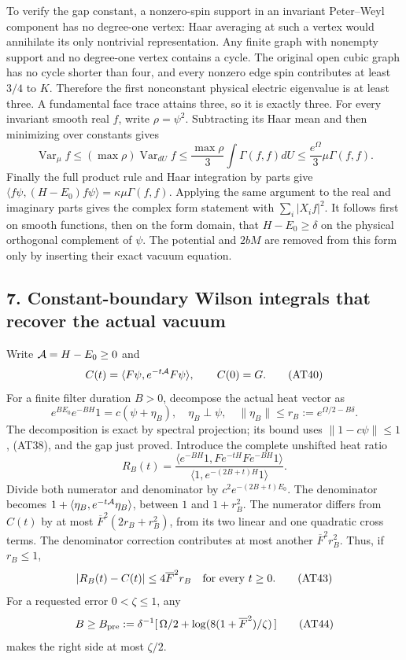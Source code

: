 \documentclass[11pt]{article}
\begin{document}
To verify the gap constant, a nonzero-spin support in an invariant Peter–Weyl component has no degree-one vertex: Haar averaging at such a vertex would annihilate its only nontrivial representation. Any finite graph with nonempty support and no degree-one vertex contains a cycle. The original open cubic graph has no cycle shorter than four, and every nonzero edge spin contributes at least \(3/4\) to \(K\). Therefore the first nonconstant physical electric eigenvalue is at least three. A fundamental face trace attains three, so it is exactly three.
For every invariant smooth real \(f\), write \(\rho=\psi^2\). Subtracting its Haar mean and then minimizing over constants gives
\[
 \operatorname{Var}_\mu f
 \le(\max\rho)\operatorname{Var}_{dU}f
 \le\frac{\max\rho}{3}\int\Gamma(f,f)dU
 \le\frac{e^\Omega}{3}\mu\Gamma(f,f).
 \tag{AT39}
\]
Finally the full product rule and Haar integration by parts give
\(\langle f\psi,(H-E_0)f\psi\rangle=\kappa\mu\Gamma(f,f)\).
Applying the same argument to the real and imaginary parts gives the complex form statement with \(\sum_i|X_if|^2\). It follows first on smooth functions, then on the form domain, that
\(H-E_0\ge\delta\) on the physical orthogonal complement of \(\psi\).
The potential and \(2bM\) are removed from this form only by inserting their exact vacuum equation.

\subsection*{7. Constant-boundary Wilson integrals that recover the actual vacuum}

Write \({\cal A}=H-E_0\ge0\) and
\[
 C(t)=\langle F\psi,e^{-t{\cal A}}F\psi\rangle,\qquad C(0)=G.
 \tag{AT40}
\]
For a finite filter duration \(B>0\), decompose the actual heat vector as
\[
 e^{BE_0}e^{-BH}1=c(\psi+\eta_B),\quad
 \eta_B\perp\psi,\quad
 \|\eta_B\|\le r_B:=e^{\Omega/2-B\delta}.
 \tag{AT41}
\]
The decomposition is exact by spectral projection; its bound uses
\(\|1-c\psi\|\le1\), (AT38), and the gap just proved. Introduce the complete unshifted heat ratio
\[
 R_B(t)=
 \frac{\langle e^{-BH}1,F e^{-tH}F e^{-BH}1\rangle}
      {\langle1,e^{-(2B+t)H}1\rangle}.
 \tag{AT42}
\]
Divide both numerator and denominator by
\(c^2e^{-(2B+t)E_0}\). The denominator becomes
\(1+\langle\eta_B,e^{-t{\cal A}}\eta_B\rangle\), between \(1\) and \(1+r_B^2\). The numerator differs from \(C(t)\) by at most
\(\overline F^2(2r_B+r_B^2)\), from its two linear and one quadratic cross terms. The denominator correction contributes at most another \(\overline F^2r_B^2\). Thus, if \(r_B\le1\),
\[
 |R_B(t)-C(t)|\le4\overline F^2r_B
          \quad\hbox{for every }t\ge0 .
 \tag{AT43}
\]
For a requested error \(0<\zeta\le1\), any
\[
 B\ge B_{\rm pre}:=\delta^{-1}
       [\,\Omega/2+\log(8(1+\overline F^2)/\zeta)\,]
 \tag{AT44}
\]
makes the right side at most \(\zeta/2\).
\end{document}
